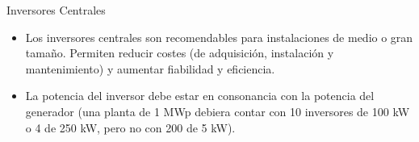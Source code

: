 \documentclass[aspectratio=169, usenames,svgnames,dvipsnames]{beamer}
\begin{document}
\begin{frame}[label={sec:org7bba028}]{Inversores Centrales}
\begin{itemize}
\item Los \alert{inversores centrales} son recomendables para instalaciones de
medio o gran tamaño. Permiten reducir costes (de adquisición,
instalación y mantenimiento) y aumentar fiabilidad y eficiencia.
\end{itemize}

\vfill

\begin{itemize}
\item \alert{La potencia del inversor debe estar en consonancia con la potencia
del generador} (una planta de 1 MWp debiera contar con 10 inversores
de 100 kW o 4 de 250 kW, pero no con 200 de 5 kW).
\end{itemize}
\end{frame}
\end{document}
